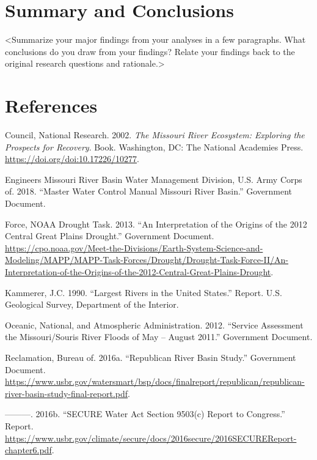 \documentclass[12pt,]{article}
\begin{document}
\newpage

\hypertarget{summary-and-conclusions}{%
\section{Summary and Conclusions}\label{summary-and-conclusions}}

\textless{}Summarize your major findings from your analyses in a few
paragraphs. What conclusions do you draw from your findings? Relate your
findings back to the original research questions and
rationale.\textgreater{}

\newpage

\hypertarget{references}{%
\section*{References}\label{references}}

\hypertarget{refs}{}
\leavevmode\hypertarget{ref-nrc2002}{}%
Council, National Research. 2002. \emph{The Missouri River Ecosystem:
Exploring the Prospects for Recovery}. Book. Washington, DC: The
National Academies Press. \url{https://doi.org/doi:10.17226/10277}.

\leavevmode\hypertarget{ref-usace2018}{}%
Engineers Missouri River Basin Water Management Division, U.S. Army
Corps of. 2018. ``Master Water Control Manual Missouri River Basin.''
Government Document.

\leavevmode\hypertarget{ref-noaa2013}{}%
Force, NOAA Drought Task. 2013. ``An Interpretation of the Origins of
the 2012 Central Great Plains Drought.'' Government Document.
\url{https://cpo.noaa.gov/Meet-the-Divisions/Earth-System-Science-and-Modeling/MAPP/MAPP-Task-Forces/Drought/Drought-Task-Force-II/An-Interpretation-of-the-Origins-of-the-2012-Central-Great-Plains-Drought}.

\leavevmode\hypertarget{ref-kammerer1990}{}%
Kammerer, J.C. 1990. ``Largest Rivers in the United States.'' Report.
U.S. Geological Survey, Department of the Interior.

\leavevmode\hypertarget{ref-noaa2012}{}%
Oceanic, National, and Atmospheric Administration. 2012. ``Service
Assessment the Missouri/Souris River Floods of May -- August 2011.''
Government Document.

\leavevmode\hypertarget{ref-bor2016-2}{}%
Reclamation, Bureau of. 2016a. ``Republican River Basin Study.''
Government Document.
\url{https://www.usbr.gov/watersmart/bsp/docs/finalreport/republican/republican-river-basin-study-final-report.pdf}.

\leavevmode\hypertarget{ref-bor2016-1}{}%
---------. 2016b. ``SECURE Water Act Section 9503(c) Report to
Congress.'' Report.
\url{https://www.usbr.gov/climate/secure/docs/2016secure/2016SECUREReport-chapter6.pdf}.
\end{document}
